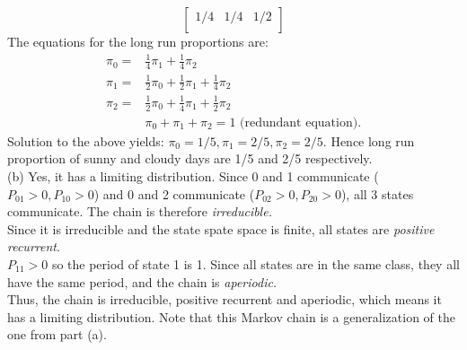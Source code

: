 \documentclass[12pt]{article}
\begin{document}
\begin{enumerate}
\begin{equation*}
\begin{bmatrix}
    1/4 & 1/4 & 1/2 \\
  \end{bmatrix}
\end{equation*}
The equations for the long run proportions are:
\begin{equation*}
\begin{split}
\pi_0 =& \frac{1}{4} \pi_1 + \frac{1}{4} \pi_2\\
\pi_1 =& \frac{1}{2} \pi_0 + \frac{1}{2} \pi_1 + \frac{1}{4}\pi_2\\
\pi_2 =& \frac{1}{2} \pi_0 + \frac{1}{4} \pi_1 + \frac{1}{2}\pi_2\\
& \pi_0 + \pi_1 + \pi_2 = 1 \mbox{ (redundant equation).}
\end{split}
\end{equation*}
Solution to the above yields: $\pi_0=1/5,\pi_1=2/5,\pi_2=2/5$. Hence
long run proportion of sunny and cloudy days are 1/5 and 2/5
respectively.  \\

(b) Yes, it has a limiting distribution. Since 0 and 1 communicate
($P_{01}>0, P_{10}>0$) and 0 and 2 communicate ($P_{02}>0, P_{20}>0$),
all 3 states communicate. The chain is therefore {\it irreducible.}\\
Since it is irreducible and the state spate space is finite, all
states are {\it positive recurrent}.\\
$P_{11}>0$ so the period of state 1 is 1. Since all states are in the
same class, they all have the same period, and the chain is {\it aperiodic.}\\
Thus, the chain is irreducible, positive recurrent and aperiodic,
which means it has a limiting distribution. Note that this Markov
chain is a generalization of the one from part (a).


\end{enumerate}
\end{document}
